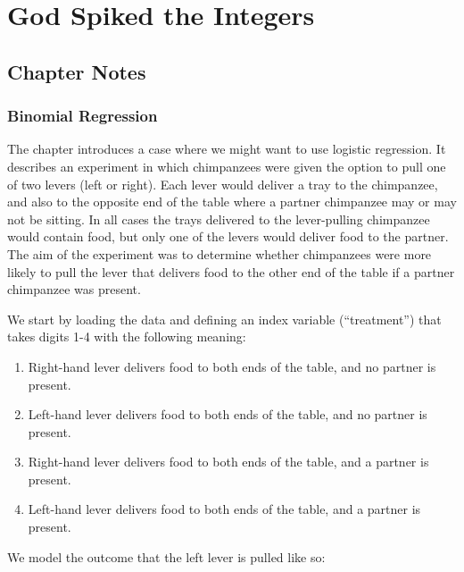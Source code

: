 \documentclass[
]{book}
\providecommand{\tightlist}{%
  \setlength{\itemsep}{0pt}\setlength{\parskip}{0pt}}
\begin{document}
\hypertarget{god_spiked}{%
\chapter{God Spiked the Integers}\label{god_spiked}}

\hypertarget{chapter-notes-10}{%
\section{Chapter Notes}\label{chapter-notes-10}}

\hypertarget{binomial-regression}{%
\subsection*{Binomial Regression}\label{binomial-regression}}

The chapter introduces a case where we might want to use logistic regression. It describes an experiment in which chimpanzees were given the option to pull one of two levers (left or right). Each lever would deliver a tray to the chimpanzee, and also to the opposite end of the table where a partner chimpanzee may or may not be sitting. In all cases the trays delivered to the lever-pulling chimpanzee would contain food, but only one of the levers would deliver food to the partner. The aim of the experiment was to determine whether chimpanzees were more likely to pull the lever that delivers food to the other end of the table if a partner chimpanzee was present.

We start by loading the data and defining an index variable (``treatment'') that takes digits 1-4 with the following meaning:

\begin{enumerate}
\def\labelenumi{\arabic{enumi}.}
\tightlist
\item
  Right-hand lever delivers food to both ends of the table, and no partner is present.
\item
  Left-hand lever delivers food to both ends of the table, and no partner is present.
\item
  Right-hand lever delivers food to both ends of the table, and a partner is present.
\item
  Left-hand lever delivers food to both ends of the table, and a partner is present.
\end{enumerate}

We model the outcome that the left lever is pulled like so:
\end{document}
